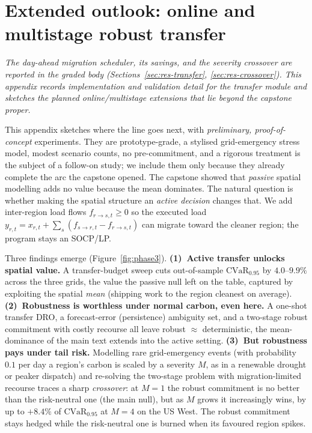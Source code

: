\documentclass[10pt,twocolumn]{article}
\newcommand{\CVaR}{\mathrm{CVaR}}
\begin{document}
\section{Extended outlook: online and multistage robust transfer}\label{app:phase3}
\emph{The day-ahead migration scheduler, its savings, and the severity crossover are
reported in the graded body (Sections~\ref{sec:res-transfer},
\ref{sec:res-crossover}). This appendix records implementation and validation detail
for the transfer module and sketches the planned online/multistage extensions that
lie beyond the capstone proper.}

\medskip\noindent This appendix sketches where the line goes next, with
\emph{preliminary, proof-of-concept} experiments. They are prototype-grade, a
stylised grid-emergency stress model, modest scenario counts, no pre-commitment, and a rigorous treatment is the subject of a follow-on study; we include them only because
they already complete the arc the capstone opened. The capstone showed that
\emph{passive} spatial modelling adds no value because the mean dominates. The
natural question is whether making the spatial structure an \emph{active decision}
changes that. We add inter-region load flows $f_{r\to s,t}\ge0$ so the executed load
$y_{r,t}=x_{r,t}+\sum_s(f_{s\to r,t}-f_{r\to s,t})$ can migrate toward the cleaner
region; the program stays an SOCP/LP.

Three findings emerge (Figure~\ref{fig:phase3}). \textbf{(1)~Active transfer unlocks
spatial value.} A transfer-budget sweep cuts out-of-sample $\CVaR_{0.95}$ by
$4.0$--$9.9\%$ across the three grids, the value the passive null left on the
table, captured by exploiting the spatial \emph{mean} (shipping work to the region
cleanest on average). \textbf{(2)~Robustness is worthless under normal carbon, even
here.} A one-shot transfer DRO, a forecast-error (persistence) ambiguity set, and a
two-stage robust commitment with costly recourse all leave robust $\approx$
deterministic, the mean-dominance of the main text extends into the active
setting. \textbf{(3)~But robustness pays under tail risk.} Modelling rare
grid-emergency events (with probability $0.1$ per day a region's carbon is scaled by
a severity $M$, as in a renewable drought or peaker dispatch) and re-solving the
two-stage problem with migration-limited recourse traces a sharp \emph{crossover}:
at $M=1$ the robust commitment is no better than the risk-neutral one (the main
null), but as $M$ grows it increasingly wins, by up to $+8.4\%$ of $\CVaR_{0.95}$ at
$M=4$ on the US West. The robust commitment stays hedged while the risk-neutral one
is burned when its favoured region spikes.
\end{document}
